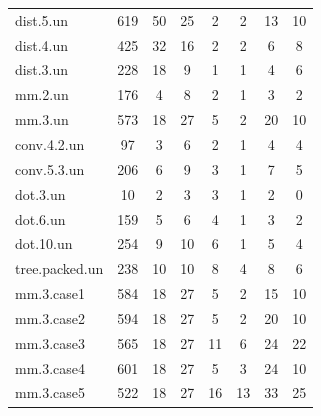 \begin{table}
\begin{tabular}{lccccccc}
    dist.5.un & 619 & 50 & 25 & 2 & 2 & 13 & 10\\
    dist.4.un & 425 & 32 & 16 & 2 & 2 & 6 & 8\\
    dist.3.un & 228 & 18 & 9 & 1 & 1 & 4 & 6\\
    mm.2.un & 176 & 4 & 8 & 2 & 1 & 3 & 2\\
    mm.3.un & 573 & 18 & 27 & 5 & 2 & 20 & 10\\
    conv.4.2.un & 97 & 3 & 6 & 2 & 1 & 4 & 4\\
    conv.5.3.un & 206 & 6 & 9 & 3 & 1 & 7 & 5\\
    dot.3.un & 10 & 2 & 3 & 3 & 1 & 2 & 0\\
    dot.6.un & 159 & 5 & 6 & 4 & 1 & 3 & 2\\
    dot.10.un & 254 & 9 & 10 & 6 & 1 & 5 & 4\\
    tree.packed.un & 238 & 10 & 10 & 8 & 4 & 8 & 6\\
    mm.3.case1 & 584 & 18 & 27 & 5 & 2 & 15 & 10\\
    mm.3.case2 & 594 & 18 & 27 & 5 & 2 & 20 & 10\\
    mm.3.case3 & 565 & 18 & 27 & 11 & 6 & 24 & 22\\
    mm.3.case4 & 601 & 18 & 27 & 5 & 3 & 24 & 10\\
    mm.3.case5 & 522 & 18 & 27 & 16 & 13 & 33 & 25\\\bottomrule
    \end{tabular}
    \end{table}
    

